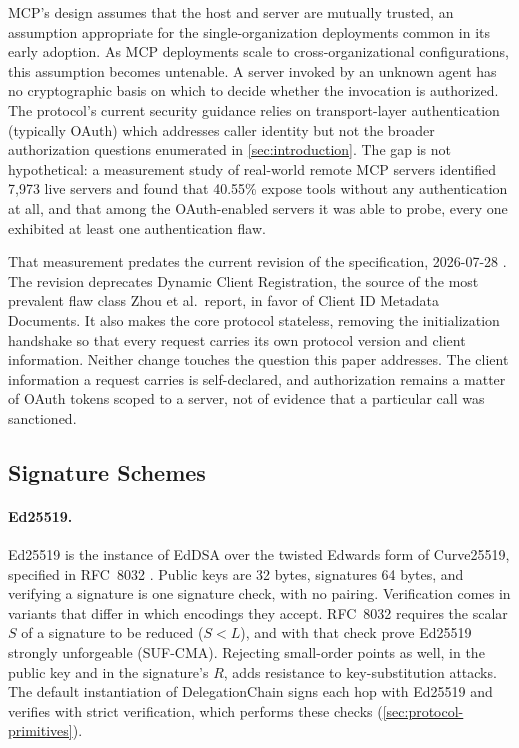 \documentclass[11pt,a4paper]{article}
\begin{document}
MCP's design assumes that the host and server are mutually trusted, an
assumption appropriate for the single-organization deployments common in
its early adoption. As MCP deployments scale to cross-organizational
configurations, this assumption becomes untenable. A server invoked by an
unknown agent has no cryptographic basis on which to decide whether the
invocation is authorized. The protocol's current security guidance relies
on transport-layer authentication (typically OAuth) which addresses caller
identity but not the broader authorization questions enumerated in
\cref{sec:introduction}. The gap is not hypothetical: a measurement study
of real-world remote MCP servers \citep{zhou2026mcpauth} identified 7,973
live servers and found that 40.55\% expose tools without any
authentication at all, and that among the OAuth-enabled servers it was
able to probe, every one exhibited at least one authentication flaw.

That measurement predates the current revision of the specification,
2026-07-28 \citep{anthropic-mcp}. The revision deprecates Dynamic Client
Registration, the source of the most prevalent flaw class Zhou et al.\
report, in favor of Client ID Metadata Documents. It also makes the core
protocol stateless, removing the initialization handshake so that every
request carries its own protocol version and client information. Neither
change touches the question this paper addresses. The client
information a request carries is self-declared, and authorization
remains a matter of OAuth tokens scoped to a server, not of evidence
that a particular call was sanctioned.

\subsection{Signature Schemes}
\label{sec:bg-bls}

\paragraph{Ed25519.}
Ed25519 is the instance of EdDSA over the twisted Edwards form of
Curve25519, specified in RFC~8032 \citep{rfc8032}. Public keys are 32
bytes, signatures 64 bytes, and verifying a signature is one signature
check, with no pairing. Verification comes in variants that differ in
which encodings they accept. RFC~8032 requires the scalar $S$ of a
signature to be reduced ($S < L$), and with that check
\citet{brendel2021ed25519} prove Ed25519 strongly unforgeable (SUF-CMA).
Rejecting small-order points as well, in the public key and in the
signature's $R$, adds resistance to key-substitution attacks. The
default instantiation of DelegationChain signs each hop with Ed25519
and verifies with strict verification, which performs these checks
(\cref{sec:protocol-primitives}).
\end{document}
